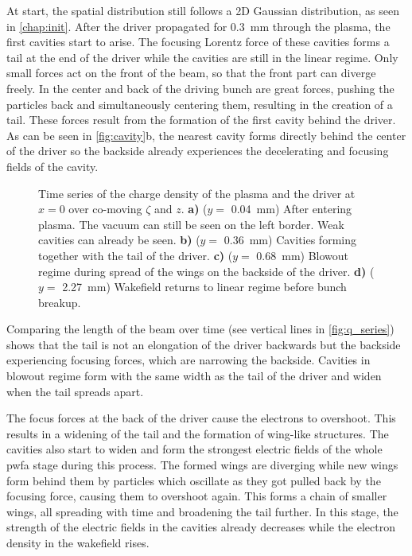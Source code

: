 \documentclass[bachelor_thesis]{subfiles}
\begin{document}
At start, the spatial distribution still follows a 2D Gaussian distribution, as seen in \autoref{chap:init}. After the driver propagated for \qty{0.3}{mm} through the plasma, the first cavities start to arise. The focusing Lorentz force of these cavities forms a tail at the end of the driver while the cavities are still in the linear regime.
Only small forces act on the front of the beam, so that the front part can diverge freely. In the center and back of the driving bunch are great forces, pushing the particles back and simultaneously centering them, resulting in the creation of a tail.
These forces result from the formation of the first cavity behind the driver. As can be seen in \autoref{fig:cavity}b, the nearest cavity forms directly behind the center of the driver so the backside already experiences the decelerating and focusing fields of the cavity.
\begin{figure}
	\centering
	
	\caption{Time series of the charge density of the plasma and the driver at $x=0$ over co-moving $\zeta$ and $z$.
	\textbf{a)} ($y=$ \qty{0.04}{mm}) After entering plasma. The vacuum can still be seen on the left border. Weak cavities can already be seen.
	\textbf{b)} ($y=$ \qty{0.36}{mm}) Cavities forming together with the tail of the driver.
	\textbf{c)} ($y=$ \qty{0.68}{mm}) Blowout regime during spread of the wings on the backside of the driver.
	\textbf{d)} ($y=$ \qty{2.27}{mm}) Wakefield returns to linear regime before bunch breakup.}
	\label{fig:cavity}
\end{figure}
Comparing the length of the beam over time (see vertical lines in \autoref{fig:q_series}) shows that the tail is not an elongation of the driver backwards but the backside experiencing focusing forces, which are narrowing the backside.
Cavities in blowout regime form with the same width as the tail of the driver and widen when the tail spreads apart.

The focus forces at the back of the driver cause the electrons to overshoot. This results in a widening of the tail and the formation of wing-like structures. The cavities also start to widen and form the strongest electric fields of the whole \gls{pwfa} stage during this process.
The formed wings are diverging while new wings form behind them by particles which oscillate as they got pulled back by the focusing force, causing them to overshoot again. This forms a chain of smaller wings, all spreading with time and broadening the tail further.
In this stage, the strength of the electric fields in the cavities already decreases while the electron density in the wakefield rises.
\end{document}
